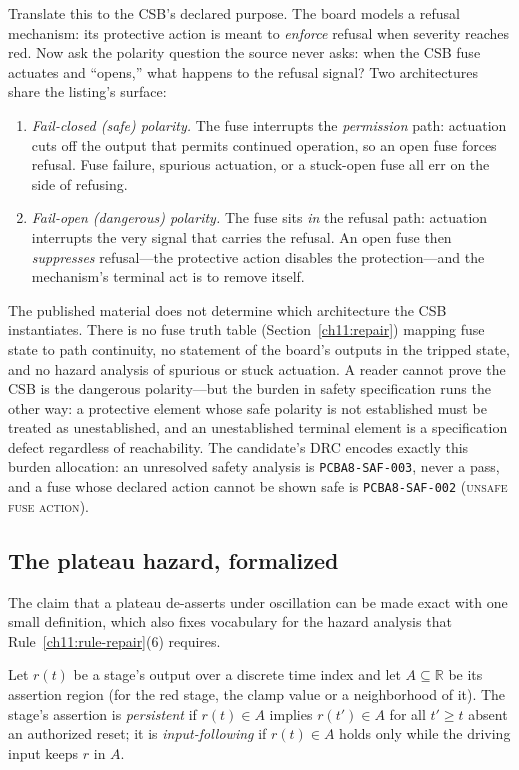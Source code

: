 Translate this to the CSB's declared purpose. The board models a refusal mechanism: its protective action is meant to \emph{enforce} refusal when severity reaches red. Now ask the polarity question the source never asks: when the CSB fuse actuates and ``opens,'' what happens to the refusal signal? Two architectures share the listing's surface:

\begin{enumerate}
\item \emph{Fail-closed (safe) polarity.} The fuse interrupts the \emph{permission} path: actuation cuts off the output that permits continued operation, so an open fuse forces refusal. Fuse failure, spurious actuation, or a stuck-open fuse all err on the side of refusing.
\item \emph{Fail-open (dangerous) polarity.} The fuse sits \emph{in} the refusal path: actuation interrupts the very signal that carries the refusal. An open fuse then \emph{suppresses} refusal---the protective action disables the protection---and the mechanism's terminal act is to remove itself.
\end{enumerate}

The published material does not determine which architecture the CSB instantiates. There is no fuse truth table (Section~\ref{ch11:repair}) mapping fuse state to path continuity, no statement of the board's outputs in the tripped state, and no hazard analysis of spurious or stuck actuation. A reader cannot prove the CSB is the dangerous polarity---but the burden in safety specification runs the other way: a protective element whose safe polarity is not established must be treated as unestablished, and an unestablished terminal element is a specification defect regardless of reachability. The candidate's DRC encodes exactly this burden allocation: an unresolved safety analysis is \texttt{PCBA8-SAF-003}, never a pass, and a fuse whose declared action cannot be shown safe is \texttt{PCBA8-SAF-002} (\textsc{unsafe fuse action}).

\subsection{The plateau hazard, formalized}\label{ch11:plateau-formal}

The claim that a plateau de-asserts under oscillation can be made exact with one small definition, which also fixes vocabulary for the hazard analysis that Rule~\ref{ch11:rule-repair}(6) requires.

\begin{definition}\label{ch11:def-persist}
Let $r(t)$ be a stage's output over a discrete time index and let $A\subseteq\mathbb{R}$ be its assertion region (for the red stage, the clamp value or a neighborhood of it). The stage's assertion is \emph{persistent} if $r(t)\in A$ implies $r(t')\in A$ for all $t'\ge t$ absent an authorized reset; it is \emph{input-following} if $r(t)\in A$ holds only while the driving input keeps $r$ in $A$.
\end{definition}

